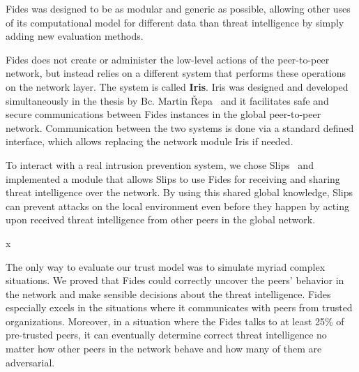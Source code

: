 Fides was designed to be as modular and generic as possible, allowing other uses of its computational model for different data than threat intelligence by simply adding new evaluation methods.

Fides does not create or administer the low-level actions of the peer-to-peer network, but instead relies on a different system that performs these operations on the network layer. The system is called \textbf{Iris}. Iris was designed and developed simultaneously in the thesis by Bc. Martin Řepa~\cite{nl} and it facilitates safe and secure communications between Fides instances in the global peer-to-peer network. Communication between the two systems is done via a standard defined interface, which allows replacing the network module Iris if needed.

To interact with a real intrusion prevention system, we chose Slips~\cite{slips} and implemented a module that allows Slips to use Fides for receiving and sharing threat intelligence over the network. 
By using this shared global knowledge, Slips can prevent attacks on the local environment even before they happen by acting upon received threat intelligence from other peers in the global network.

x

The only way to evaluate our trust model was to simulate myriad complex situations. We proved that Fides could correctly uncover the peers' behavior in the network and make sensible decisions about the threat intelligence. 
Fides especially excels in the situations where it communicates with peers from trusted organizations.
Moreover, in a situation where the Fides talks to at least 25\% of pre-trusted peers, it can eventually determine correct threat intelligence no matter how other peers in the network behave and how many of them are adversarial.

